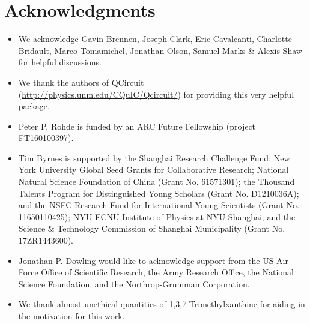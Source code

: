%
%

\section*{Acknowledgments}

\begin{itemize}
\item We acknowledge Gavin Brennen, Joseph Clark, Eric Cavalcanti, Charlotte Bridault, Marco Tomamichel, Jonathan Olson, Samuel Marks \& Alexis Shaw for helpful discussions.
\item We thank the authors of QCircuit (\href{http://physics.unm.edu/CQuIC/Qcircuit/}{http://physics.unm.edu/CQuIC/Qcircuit/}) for providing this very helpful package.
\item Peter P. Rohde is funded by an ARC Future Fellowship (project FT160100397).
\item Tim Byrnes is supported by the Shanghai Research Challenge Fund; New York University Global Seed Grants for Collaborative Research; National Natural Science Foundation of China (Grant No. 61571301); the Thousand Talents Program for Distinguished Young Scholars (Grant No. D1210036A); and the NSFC Research Fund for International Young Scientists (Grant No. 11650110425); NYU-ECNU Institute of Physics at NYU Shanghai; and the Science \& Technology Commission of Shanghai Municipality (Grant No. 17ZR1443600).
\item Jonathan P. Dowling would like to acknowledge support from the US Air Force Office of Scientific Research, the Army Research Office, the National Science Foundation, and the Northrop-Grumman Corporation.
\item We thank almost unethical quantities of 1,3,7-Trimethylxanthine for aiding in the motivation for this work.
\end{itemize}